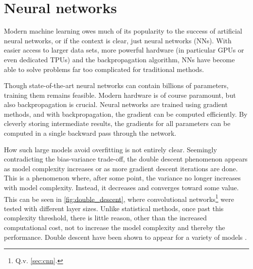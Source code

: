 \section{Neural networks}
\label{sec:nn}
Modern machine learning owes much of its popularity to the success of artificial neural networks, or if the context is clear, just neural networks (NNs).
With easier access to larger data sets, more powerful hardware (in particular GPUs or even dedicated TPUs) and the backpropagation algorithm, NNs have become able to solve problems far too complicated for traditional methods.

Though state-of-the-art neural networks can contain billions of parameters, training them remains feasible.
Modern hardware is of course paramount, but also backpropagation is crucial.
Neural networks are trained using gradient methods, and with backpropagation, the gradient can be computed efficiently.
By cleverly storing intermediate results, the gradients for all parameters can be computed in a single backward pass through the network.

How such large models avoid overfitting is not entirely clear.
Seemingly contradicting the bias-variance trade-off, the double descent phenomenon appears as model complexity increases or as more gradient descent iterations are done.
This is a phenomenon where, after some point, the variance no longer increases with model complexity.
Instead, it decreases and converges toward some value.
This can be seen in \cref{fig:double_descent}, where convolutional networks\footnote{Q.v. \cref{sec:cnn}.} were tested with different layer sizes.
Unlike statistical methods, once past this complexity threshold, there is little reason, other than the increased computational cost, not to increase the model complexity and thereby the performance.
Double descent have been shown to appear for a variety of models \cite{nakkiran2021}.


